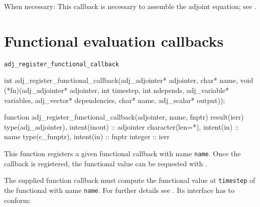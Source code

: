 When necessary: 
This callback is necessary to assemble the adjoint equation; see .

\section{Functional evaluation callbacks}

\begin{boxwithtitle}{\texttt{adj_register_functional_callback}}
\begin{minipage}{\columnwidth}
\begin{ccode}
  int adj_register_functional_callback(adj_adjointer* adjointer, char* name, 
                             void (*fn)(adj_adjointer* adjointer, int timestep, 
                                        int ndepends, adj_variable* variables, 
                                        adj_vector* dependencies, char* name, 
                                        adj_scalar* output));
\end{ccode}
\begin{fortrancode}
  function adj_register_functional_callback(adjointer, name, fnptr) result(ierr)
    type(adj_adjointer), intent(inout) :: adjointer
    character(len=*), intent(in) :: name
    type(c_funptr), intent(in) :: fnptr
    integer :: ierr
\end{fortrancode}
\end{minipage}
\end{boxwithtitle}
This function registers a given functional callback with name \texttt{name}.
Once the callback is registered, the functional value can be requested with .

The supplied function callback must compute the functional value at \texttt{timestep} of the functional with name \texttt{name}. 
For further details see .
Its interface has to conform:

